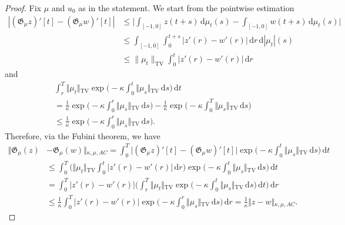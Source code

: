 \documentclass[reqno]{amsart}
\theoremstyle{plain}
\numberwithin{equation}{section}
\numberwithin{definition}{section}
\newcommand{\dd}{\ensuremath{\mathrm{d}}}
\begin{document}
\begin{proof}
    Fix $\mu$ and $u_0$ as in the statement. We start from the pointwise estimation 
    \begin{equation*}
        \begin{split}
            |(\mathfrak{G}_{\mu}z)'[t] - (\mathfrak{G}_{\mu}w)'[t]| & \le \Big| \int_{[-1,0]} z(t+s) \, \dd \mu_t(s)- \int_{[-1,0]} w(t+s) \, \dd \mu_t(s) \Big|  \\
            & \le \int_{[-1,0]} \int_0^{t+s} \vert{}z'(r) - w'(r)\vert{} \, \dd r \, \dd |\mu_t|(s) \\
            & \le \|\mu_t\|_{\mathrm{TV}} \int_0^{t} \vert{}z'(r) - w'(r)\vert{} \, \dd r
        \end{split}
    \end{equation*}
and 
\begin{multline*}
        \int_r^T \Vert{}\mu_t\Vert{}_{\text{TV}} \exp\Big(-\kappa \int_0^t \Vert{}\mu_s\Vert{}_{\text{TV}} \, \text{d}s\Big) \, \text{d}t \\ =  \frac{1}{\kappa} \exp\Big(-\kappa \int_0^r \Vert{}\mu_s\Vert{}_{\text{TV}} \, \text{d}s\Big) - \frac{1}{\kappa} \exp\Big(-\kappa \int_0^T \Vert{}\mu_s\Vert{}_{\text{TV}} \, \text{d}s\Big) \\ \le \frac{1}{\kappa} \exp\Big(-\kappa \int_0^r \Vert{}\mu_s\Vert{}_{\text{TV}} \, \text{d}s\Big). 
\end{multline*}
Therefore, via the Fubini theorem, we have 
\begin{equation*}
\begin{split}
     \Vert{}\mathfrak{G}_\mu  (z) & - \mathfrak{G}_\mu (w)\Vert{}_{\kappa, \mu, AC}  = \int_0^T \vert{}(\mathfrak{G}_\mu z)'[t] - (\mathfrak{G}_\mu w)'[t]\vert{} \exp\Big(-\kappa \int_0^t \Vert{}\mu_s\Vert{}_{\text{TV}} \, \text{d}s\Big) \, \text{d}t \\
     & \le \int_0^T \Big( \Vert{}\mu_t\Vert{}_{\text{TV}} \int_0^t \vert{}z'(r) - w'(r)\vert{} \, \text{d}r \Big) \exp\Big(-\kappa \int_0^t \Vert{}\mu_s\Vert{}_{\text{TV}} \, \text{d}s\Big) \, \text{d}t \\
     & = \int_0^T \vert{}z'(r) - w'(r)\vert{} \Big(  \int_r^T \Vert{}\mu_t\Vert{}_{\mathrm{TV}} \exp\Big(-\kappa \int_0^t \Vert{}\mu_s\Vert{}_{\mathrm{TV}} \, \dd s\Big) \, \dd t \Big) \, \dd r \\
     & \le \frac{1}{\kappa} \int_0^T \vert{}z'(r) - w'(r)\vert{} \exp\Big(-\kappa \int_0^r \Vert{}\mu_s\Vert{}_{\text{TV}} \, \text{d}s\Big) \, \text{d}r = \frac{1}{\kappa} \Vert{}z - w\Vert{}_{\kappa, \mu, AC}. 
\end{split}
\end{equation*}  
\end{proof}
\end{document}
